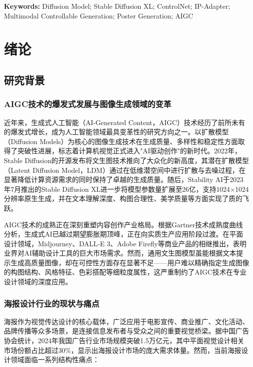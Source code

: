 \documentclass[12pt,a4paper]{ctexart}
\newcommand{\sdxl}{Stable Diffusion XL}
\begin{document}
\vspace{1em}
\noindent \textbf{Keywords:} Diffusion Model; Stable Diffusion XL; ControlNet; IP-Adapter; Multimodal Controllable Generation; Poster Generation; AIGC

\newpage
\tableofcontents
\newpage

\section{绪论}

\subsection{研究背景}

\subsubsection{AIGC技术的爆发式发展与图像生成领域的变革}

近年来，生成式人工智能（AI-Generated Content，AIGC）技术经历了前所未有的爆发式增长，成为人工智能领域最具变革性的研究方向之一。以扩散模型（Diffusion Models）为核心的图像生成技术在生成质量、多样性和稳定性方面取得了突破性进展，标志着计算机视觉正式进入"AI驱动创作"的新时代。2022年，Stable Diffusion的开源发布将文生图技术推向了大众化的新高度，其潜在扩散模型（Latent Diffusion Model，LDM）通过在低维潜空间中进行扩散与去噪过程，在显著降低计算资源需求的同时保持了卓越的生成质量。随后，Stability AI于2023年7月推出的\sdxl{}进一步将模型参数量扩展至26亿，支持1024$\times$1024分辨率原生生成，并在文本理解深度、构图合理性、美学质量等方面实现了质的飞跃。

AIGC技术的成熟正在深刻重塑内容创作产业格局。根据Gartner技术成熟度曲线分析，生成式AI已越过期望膨胀期顶峰，正在向实质生产应用阶段过渡。在平面设计领域，Midjourney、DALL-E 3、Adobe Firefly等商业产品的相继推出，表明业界对AI辅助设计工具的巨大市场需求。然而，通用文生图模型虽能根据文本提示生成高质量图像，却在可控性方面存在显著不足——用户难以精确指定生成图像的构图结构、风格特征、色彩搭配等细粒度属性，这严重制约了AIGC技术在专业设计领域的深度应用。

\subsubsection{海报设计行业的现状与痛点}

海报作为视觉传达设计的核心载体，广泛应用于电影宣传、商业推广、文化活动、品牌传播等众多场景，是连接信息发布者与受众之间的重要视觉桥梁。据中国广告协会统计，2024年我国广告行业市场规模突破1.5万亿元，其中平面视觉设计相关市场份额占比超过30\%，显示出海报设计市场的庞大需求体量。然而，当前海报设计领域面临一系列结构性痛点：
\end{document}
